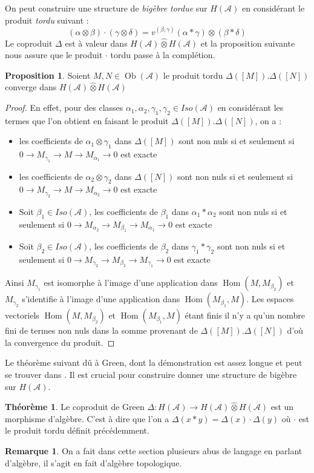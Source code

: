 \documentclass[12pt]{article}
\DeclareMathOperator{\Hom}{Hom}
\DeclareMathOperator{\ob}{Ob}
\theoremstyle{definition}
\newtheorem{theo}{Théorème}[section]
\newtheorem{Prop}{Proposition}[section]
\newtheorem{rem}{Remarque}[section]
\begin{document}
On peut construire une structure de \textit{bigèbre tordue} sur $H(\mathcal{A})$ en considérant le produit \textit{tordu} suivant : $$(\alpha\otimes \beta)\cdot(\gamma\otimes \delta)=v^{\left(\beta,\gamma\right)}(\alpha\ast\gamma)\otimes(\beta\ast\delta)$$ Le coproduit $\Delta$ est à valeur dans $H(\mathcal{A})\widehat{\otimes} H(\mathcal{A})$ et la proposition suivante nous assure que le produit $\cdot$ tordu passe à la complétion.
\begin{Prop} Soient $M,N\in\ob(\mathcal{A})$ le produit tordu $\Delta([M]).\Delta([N])$ converge dans $H(\mathcal{A})\widehat{\otimes} H(\mathcal{A})$ \end{Prop}
\begin{proof}
En effet, pour des classes $\alpha_1,\alpha_2,\gamma_1,\gamma_2\in Iso(\mathcal{A})$ en considérant les termes que l'on obtient en faisant le produit $\Delta([M]).\Delta([N])$, on a : \begin{itemize}
\item les coefficients de $\alpha_1\otimes \gamma_1$ dans $\Delta([M])$ sont non nuls si et seulement si $0\to M_{\gamma_1} \to M\to M_{\alpha_1}\to 0$ est exacte
\item les coefficients de $\alpha_2\otimes \gamma_2$ dans $\Delta([N])$ sont non nuls si et seulement si $0\to M_{\gamma_2} \to M\to M_{\alpha_2}\to 0$ est exacte
\item Soit $\beta_1\in Iso(\mathcal{A})$, les coefficients de $\beta_1$  dans $\alpha_1\ast \alpha_2$  sont non nuls si et seulement si $0\to M_{\alpha_2}\to M_{\beta_1}\to M_{\alpha_1}\to 0$ est exacte
\item Soit $\beta_2\in Iso(\mathcal{A})$, les coefficients de $\beta_2$ dans $\gamma_1\ast \gamma_2$ sont non nuls si et seulement si $0\to M_{\gamma_2}\to M_{\beta_2}\to M_{\gamma_1}\to 0$ est exacte
\end{itemize}
Ainsi $M_{\gamma_1}$ est isomorphe à l'image d'une application dans $\Hom(M,M_{\beta_2})$ et $M_{\gamma_2}$ s'identifie à l'image d'une application dans $\Hom(M_{\beta_1},M)$. Les espaces vectoriels $\Hom(M,M_{\beta_2})$ et $\Hom(M_{\beta_1},M)$ étant finis il n'y a qu'un nombre fini de termes non nuls dans la somme provenant de $\Delta([M]).\Delta([N])$ d'où la convergence du produit.
\end{proof}
Le théorème suivant dû à Green, dont la démonstration est assez longue et peut se trouver dans \cite{Green0}. Il est crucial pour construire donner une structure de bigèbre sur $H(\mathcal{A})$.
\begin{theo} Le coproduit de Green $\Delta : H(\mathcal{A})\to H(\mathcal{A})\widehat{\otimes} H(\mathcal{A})$ est un morphisme d'algèbre. C'est à dire que l'on a $\Delta(x\ast y)=\Delta(x)\cdot \Delta(y)$ où $\cdot$ est le produit tordu définit précédemment.\end{theo}
\begin{rem} On a fait dans cette section plusieurs abus de langage en parlant d'algèbre, il s'agit en fait d'algèbre topologique. \end{rem}
\end{document}
